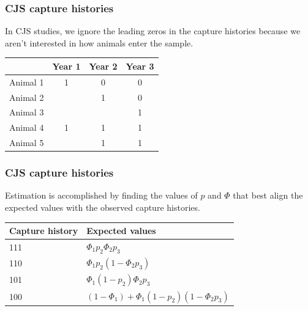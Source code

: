 \documentclass[color=usenames,dvipsnames]{beamer}\usepackage[]{graphicx}\usepackage[]{xcolor}
\begin{document}



\begin{frame}
  \frametitle{CJS capture histories}
  In CJS studies, we ignore the leading zeros in the capture histories
  because we aren't interested in how animals enter the sample. \\
  \vfill
  \vfill
  \begin{center}
    \small
    \begin{tabular}{lccc}
      \hline
      & Year 1 & Year 2 & Year 3 \\
      \hline
      Animal 1 & 1 & 0 & 0 \\
      Animal 2 &  & 1 & 0 \\
      Animal 3 &  &  & 1 \\
      Animal 4 & 1 & 1 & 1 \\
      Animal 5 &  & 1 & 1 \\
      \hline
    \end{tabular}
  \end{center}
\end{frame}



\begin{frame}
  \frametitle{CJS capture histories}
  \large
  Estimation is accomplished by finding the values of $p$ and $\Phi$
  that best align the expected values with the observed capture
  histories. \\
  \vfill
  \begin{center}
    \begin{tabular}{ll}
      \hline
      Capture history & Expected values \\
      \hline
      111 & $\Phi_1p_2\Phi_2p_3$ \\ %
      110 & $\Phi_1p_2(1-\Phi_2p_3)$ \\ %
      101 & $\Phi_1(1-p_2)\Phi_2p_3$ \\ %
      100 & $(1-\Phi_1)+\Phi_1(1-p_2)(1-\Phi_2p_3)$ \\
      \hline
    \end{tabular}
  \end{center}
\end{frame}
\end{document}
